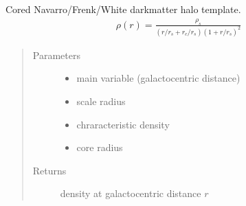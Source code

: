 \documentclass[letterpaper,10pt,english]{sphinxmanual}
\begin{document}
\begin{fulllineitems}
\label{\detokenize{diffsph.profiles:diffsph.profiles.templates.cnfw}}
\sphinxAtStartPar
Cored Navarro/Frenk/White dark\sphinxhyphen{}matter halo template.
\begin{equation*}
\begin{split}\rho(r) = \frac{\rho_s}{(r/r_s+r_c/r_s)(1+r/r_s)^2}\end{split}
\end{equation*}\begin{quote}\begin{description}
\item[{Parameters}] \leavevmode\begin{itemize}
\item {} 
\sphinxAtStartPar
{} \textendash{} main variable (galactocentric distance)

\item {} 
\sphinxAtStartPar
{} \textendash{} scale radius

\item {} 
\sphinxAtStartPar
{} \textendash{} chraracteristic density

\item {} 
\sphinxAtStartPar
{} \textendash{} core radius

\end{itemize}

\item[{Returns}] \leavevmode
\sphinxAtStartPar
density at galactocentric distance \(r\)

\end{description}\end{quote}

\end{fulllineitems}

\end{document}
